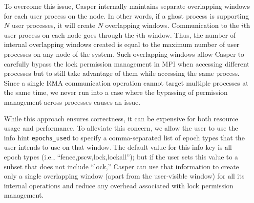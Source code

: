 To overcome this issue, Casper internally maintains separate
overlapping windows for each user process on the node. In other words, if a
ghost process is supporting $N$ user processes, it will create $N$
overlapping windows.  Communication to the $i$th user process on each
node goes through the $i$th window.  Thus, the number of internal
overlapping windows created is equal to the maximum number of user
processes on any node of the system.  Such overlapping windows allow
Casper to carefully bypass the lock permission management in MPI when
accessing different processes but to still take advantage of them while
accessing the same process.  Since a single RMA communication
operation cannot target multiple processes at the same time, we never
run into a case where the bypassing of permission management across
processes causes an issue.

While this approach ensures correctness, it can be expensive for both
resource usage and performance.  To alleviate this concern, we allow
the user to use the info hint \texttt{epochs\_used} to specify a
comma-separated list of epoch types that the user intends to use on that
window.  The default value for this info key is all epoch types (i.e.,
``fence,pscw,lock,lockall''); but if the user sets this value to a
subset that does not include ``lock,'' Casper can use that information
to create only a single overlapping window (apart from the
user-visible window) for all its internal operations and reduce any
overhead associated with lock permission management.




